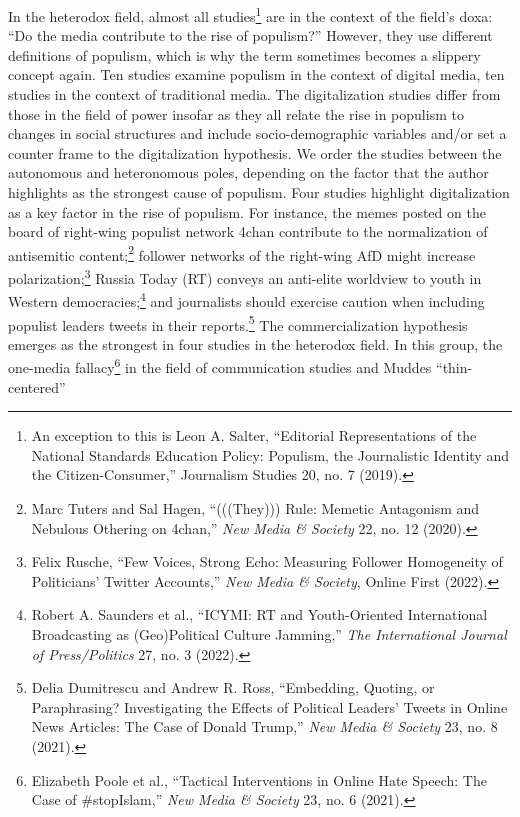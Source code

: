 \documentclass{tufte-handout}
\begin{document}
{{In the heterodox field, almost all studies\footnote{An exception to this
  is Leon A. Salter, ``Editorial Representations of the National
  Standards Education Policy: Populism, the Journalistic Identity and
  the Citizen-Consumer,'' Journalism Studies 20, no. 7 (2019).} are in
the context of the field's doxa: ``Do the media contribute to the rise
of populism?'' However, they use different definitions of populism,
which is why the term sometimes becomes a slippery concept again. Ten
studies examine populism in the context of digital media, ten studies in
the context of traditional media. The digitalization studies differ from
those in the field of power insofar as they all relate the rise in
populism to changes in social structures and include socio-demographic
variables and/or set a counter frame to the digitalization hypothesis.
We order the studies between the autonomous and heteronomous poles,
depending on the factor that the author highlights as the strongest
cause of populism. Four studies highlight digitalization as a key factor
in the rise of populism. For instance, the memes posted on the board of
right-wing populist network 4chan contribute to the normalization of
antisemitic content;\footnote{Marc Tuters and Sal Hagen, ``(((They)))
  Rule: Memetic Antagonism and Nebulous Othering on 4chan,'' \emph{New
  Media \& Society} 22, no. 12 (2020).} follower networks of the
right-wing AfD might increase polarization;\footnote{Felix Rusche, ``Few
  Voices, Strong Echo: Measuring Follower Homogeneity of Politicians'
  Twitter Accounts,'' \emph{New Media \& Society}, Online First (2022).}
Russia Today (RT) conveys an anti-elite worldview to youth in Western
democracies;\footnote{Robert A. Saunders et al., ``ICYMI: RT and
  Youth-Oriented International Broadcasting as (Geo)Political Culture
  Jamming,'' \emph{The International Journal of Press/Politics} 27, no.
  3 (2022).} and journalists should exercise caution when including
populist leaders\textquotesingle{} tweets in their reports.\footnote{Delia
  Dumitrescu and Andrew R. Ross, ``Embedding, Quoting, or Paraphrasing?
  Investigating the Effects of Political Leaders' Tweets in Online News
  Articles: The Case of Donald Trump,'' \emph{New Media \& Society} 23,
  no. 8 (2021).} The commercialization hypothesis emerges as the
strongest in four studies in the heterodox field. In this group, the
one-media fallacy\footnote{Elizabeth Poole et al., ``Tactical
  Interventions in Online Hate Speech: The Case of \#stopIslam,''
  \emph{New Media \& Society} 23, no. 6 (2021).} in the field of
communication studies and Mudde\textquotesingle s ``thin-centered''
}}
\end{document}

